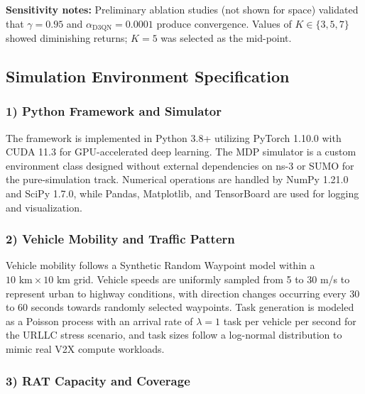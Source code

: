 \documentclass[journal,10pt,twocolumn]{IEEEtran}
\begin{document}
\textbf{Sensitivity notes:} Preliminary ablation studies (not shown for space) validated that $\gamma = 0.95$ and $\alpha_{\text{D3QN}} = 0.0001$ produce convergence. Values of $K \in \{3, 5, 7\}$ showed diminishing returns; $K = 5$ was selected as the mid-point.

\subsection{Simulation Environment Specification}

\subsubsection*{1) Python Framework and Simulator}

The framework is implemented in Python 3.8+ utilizing PyTorch 1.10.0 with CUDA 11.3 for GPU-accelerated deep learning. The MDP simulator is a custom environment class designed without external dependencies on ns-3 or SUMO for the pure-simulation track. Numerical operations are handled by NumPy 1.21.0 and SciPy 1.7.0, while Pandas, Matplotlib, and TensorBoard are used for logging and visualization.

\subsubsection*{2) Vehicle Mobility and Traffic Pattern}

Vehicle mobility follows a Synthetic Random Waypoint model within a $10 \text{ km} \times 10 \text{ km}$ grid. Vehicle speeds are uniformly sampled from 5 to 30 m/s to represent urban to highway conditions, with direction changes occurring every 30 to 60 seconds towards randomly selected waypoints. Task generation is modeled as a Poisson process with an arrival rate of $\lambda = 1$ task per vehicle per second for the URLLC stress scenario, and task sizes follow a log-normal distribution to mimic real V2X compute workloads.

\subsubsection*{3) RAT Capacity and Coverage}
\end{document}

